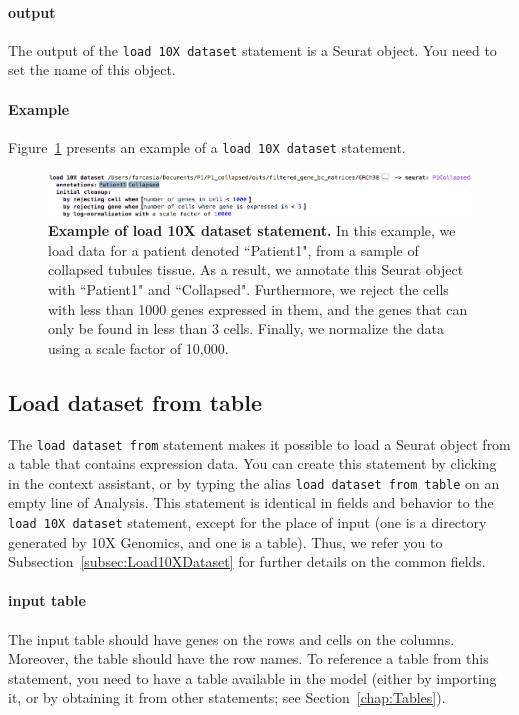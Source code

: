 \paragraph{output} The output of the \texttt{load 10X dataset} statement is a Seurat object.
You need to set the name of this object.

\paragraph{Example} Figure~\ref{fig:ExampleLoad10XDataset} presents an example of a
\texttt{load 10X dataset} statement.

\begin{figure}[h!tbp]
  \centering
  \includegraphics[width=\figWidthWide]{figures/ExampleLoad10XDataset.png}
    \caption[Example of load 10X dataset statement.]{\textbf{Example of load 10X dataset statement.}
    In this example, we load data for a patient denoted ``Patient1", from a sample of collapsed
    tubules tissue. As a result, we annotate this Seurat object with ``Patient1" and
    ``Collapsed". Furthermore, we reject the cells with less than 1000 genes expressed in
    them, and the genes that can only be found in less than 3 cells. Finally, we normalize
    the data using a scale factor of 10,000.}
\label{fig:ExampleLoad10XDataset}
\end{figure}

\subsection{Load dataset from table}
The \texttt{load dataset from} statement makes it possible to load a Seurat object from a
table that contains expression data. You can create this statement by clicking
 in the context assistant, or by typing
the alias \texttt{load dataset from table} on an empty line of Analysis. This statement
is identical in fields and behavior to the \texttt{load 10X dataset} statement, except
for the place of input (one is a directory generated by 10X Genomics, and one is a table).
Thus, we refer you to Subsection~\ref{subsec:Load10XDataset} for further details on the common fields.

\paragraph{input table}
The input table should have genes on the rows and cells on the columns.
Moreover, the table should have the row names. To reference a table
from this statement, you need to have a table available in the model (either by importing
it, or by obtaining it from other statements; see Section~\ref{chap:Tables}).

